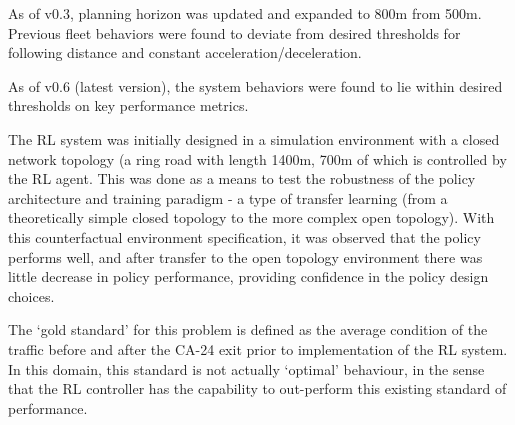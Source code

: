 \documentclass[12pt, a4paper, twocolumn]{article}
\begin{document}
\begin{multicols}{2}
{}{%

As of v0.3, planning horizon was updated and expanded to 800m from 500m. Previous fleet behaviors were found to deviate from desired thresholds for following distance and constant acceleration/deceleration.

As of v0.6 (latest version), the system behaviors were found to lie within desired thresholds on key performance metrics.

}{%

The RL system was initially designed in a simulation environment with a closed network topology (a ring road with length 1400m, 700m of which is controlled by the RL agent.
This was done as a means to test the robustness of the policy architecture and training paradigm - a type of transfer learning (from a theoretically simple closed topology to the more complex open topology).
With this counterfactual environment specification, it was observed that the policy performs well, and after transfer to the open topology environment there was little decrease in policy performance, providing confidence in the policy design choices.

}{%

The `gold standard' for this problem is defined as the average condition of the traffic before and after the CA-24 exit prior to implementation of the RL system.
In this domain, this standard is not actually `optimal' behaviour, in the sense that the RL controller has the capability to out-perform this existing standard of performance.

}




\end{multicols}
\end{document}
